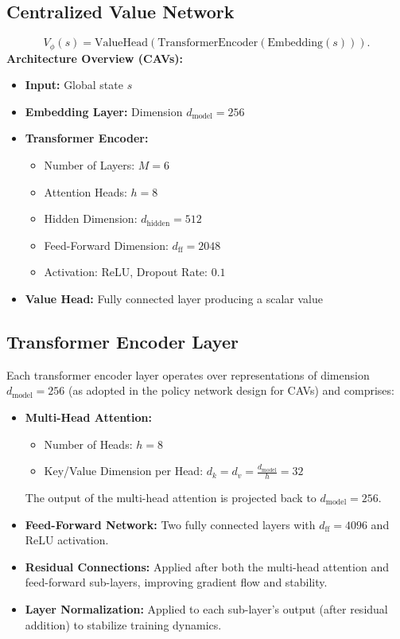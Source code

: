 \subsection{Centralized Value Network}\label{subsec:appendix_value_network}
\[
V_{\phi}(s) = \text{ValueHead}(\text{TransformerEncoder}(\text{Embedding}(s))).
\]
\noindent\textbf{Architecture Overview (CAVs):}
\begin{itemize}
    \item \textbf{Input:} Global state $s$
    \item \textbf{Embedding Layer:} Dimension $d_{\text{model}} = 256$
    \item \textbf{Transformer Encoder:}
    \begin{itemize}
        \item Number of Layers: $M = 6$
        \item Attention Heads: $h = 8$
        \item Hidden Dimension: $d_{\text{hidden}} = 512$
        \item Feed-Forward Dimension: $d_{\text{ff}} = 2048$
        \item Activation: ReLU, Dropout Rate: $0.1$
    \end{itemize}
    \item \textbf{Value Head:} Fully connected layer producing a scalar value
\end{itemize}

\subsection{Transformer Encoder Layer}\label{subsec:appendix_tf_encoder_layer}
Each transformer encoder layer operates over representations of dimension \( d_{\text{model}} = 256 \) (as adopted in the policy network design for CAVs) and comprises:
\begin{itemize}
    \item \textbf{Multi-Head Attention:} 
    \begin{itemize}
        \item Number of Heads: \( h = 8 \)
        \item Key/Value Dimension per Head: \( d_k = d_v = \frac{d_{\text{model}}}{h} = 32 \)
    \end{itemize}
    The output of the multi-head attention is projected back to \( d_{\text{model}} = 256 \).
    \item \textbf{Feed-Forward Network:} 
    Two fully connected layers with \( d_{\text{ff}} = 4096 \) and ReLU activation.
    \item \textbf{Residual Connections:} 
    Applied after both the multi-head attention and feed-forward sub-layers, improving gradient flow and stability.
    \item \textbf{Layer Normalization:}
    Applied to each sub-layer’s output (after residual addition) to stabilize training dynamics.
\end{itemize}

